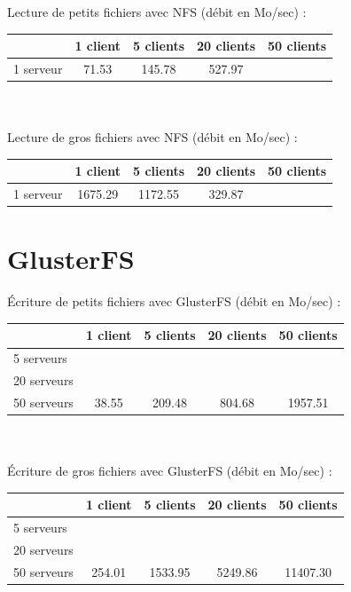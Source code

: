\documentclass[12pt]{report}
\begin{document}
			Lecture de petits fichiers avec NFS (débit en Mo/sec) :

			\begin{tabular}{|l|c|c|c|c|}
				\hline
				& 1 client & 5 clients & 20 clients & 50 clients \\
				\hline
				 1 serveur & 71.53 & 145.78 & 527.97 & \\
				\hline
			\end{tabular}\\\\

			Lecture de gros fichiers avec NFS (débit en Mo/sec) :

			\begin{tabular}{|l|c|c|c|c|}
				\hline
				& 1 client & 5 clients & 20 clients & 50 clients \\
				\hline
				1 serveur & 1675.29 & 1172.55 & 329.87& \\
				\hline
			\end{tabular}

			\newpage

			\section{GlusterFS}

			Écriture de petits fichiers avec GlusterFS (débit en Mo/sec) :

			\begin{tabular}{|l|c|c|c|c|}
				\hline
				& 1 client & 5 clients & 20 clients & 50 clients \\
				\hline
				5 serveurs & & & & \\
				\hline
				20 serveurs & & & & \\
				\hline
				50 serveurs & 38.55 & 209.48 & 804.68 & 1957.51 \\
				\hline
			\end{tabular}\\\\

			Écriture de gros fichiers avec GlusterFS (débit en Mo/sec) :

			\begin{tabular}{|l|c|c|c|c|}
				\hline
				& 1 client & 5 clients & 20 clients & 50 clients \\
				\hline
				5 serveurs & & & & \\
				\hline
				20 serveurs & & & & \\
				\hline
				50 serveurs & 254.01 & 1533.95 & 5249.86 & 11407.30 \\
				\hline
			\end{tabular}\\\\
\end{document}
